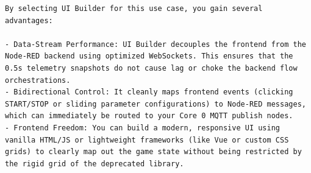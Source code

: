 \begin{lstlisting}[language={}, breaklines=true]
By selecting UI Builder for this use case, you gain several advantages:

- Data-Stream Performance: UI Builder decouples the frontend from the Node-RED backend using optimized WebSockets. This ensures that the 0.5s telemetry snapshots do not cause lag or choke the backend flow orchestrations.
- Bidirectional Control: It cleanly maps frontend events (clicking START/STOP or sliding parameter configurations) to Node-RED messages, which can immediately be routed to your Core 0 MQTT publish nodes.
- Frontend Freedom: You can build a modern, responsive UI using vanilla HTML/JS or lightweight frameworks (like Vue or custom CSS grids) to clearly map out the game state without being restricted by the rigid grid of the deprecated library.
\end{lstlisting}
